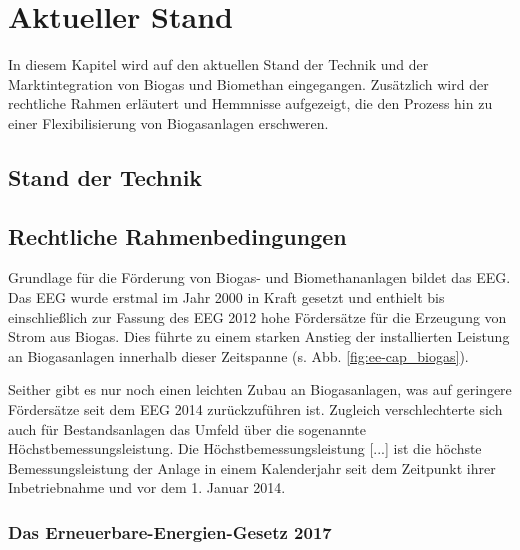 \section{Aktueller Stand}

In diesem Kapitel wird auf den aktuellen Stand der Technik und der Marktintegration von Biogas und Biomethan eingegangen. Zusätzlich wird der rechtliche Rahmen erläutert und Hemmnisse aufgezeigt, die den Prozess hin zu einer Flexibilisierung von Biogasanlagen erschweren.

\subsection{Stand der Technik}


\subsection{Rechtliche Rahmenbedingungen}\label{chap:law_theo}

Grundlage für die Förderung von Biogas- und Biomethananlagen bildet das \gls{EEG}. Das \gls{EEG} wurde erstmal im Jahr 2000 in Kraft gesetzt und enthielt bis einschließlich zur Fassung des \gls{EEG} 2012 hohe Fördersätze für die Erzeugung von Strom aus Biogas. Dies führte zu einem starken Anstieg der installierten Leistung an Biogasanlagen innerhalb dieser Zeitspanne (s. Abb. \ref{fig:ee-cap_biogas}). \parencite{DanielGromke2019}\smallskip

Seither gibt es nur noch einen leichten Zubau an Biogasanlagen, was auf geringere Fördersätze seit dem \gls{EEG} 2014 zurückzuführen ist. Zugleich verschlechterte sich auch für Bestandsanlagen das Umfeld über die sogenannte Höchstbemessungsleistung. Die \glqq{} Höchstbemessungsleistung [...] ist die höchste Bemessungsleistung der Anlage in einem Kalenderjahr seit dem Zeitpunkt ihrer Inbetriebnahme und vor dem 1. Januar 2014.\grqq \parencite{BJV2014a}

\subsubsection{Das Erneuerbare-Energien-Gesetz 2017}




